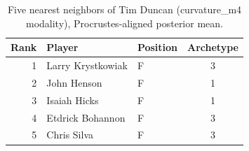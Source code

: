 \begin{table}[htbp]
  \centering\small
  \begin{tabular}{rllc}
    \toprule
    Rank & Player & Position & Archetype \\
    \midrule
    1 & Larry Krystkowiak & F & 3 \\
    2 & John Henson & F & 1 \\
    3 & Isaiah Hicks & F & 1 \\
    4 & Etdrick Bohannon & F & 3 \\
    5 & Chris Silva & F & 3 \\
    \bottomrule
  \end{tabular}
  \caption{Five nearest neighbors of Tim Duncan (curvature_m4 modality), Procrustes-aligned posterior mean.}
  \label{tab:Tim_Duncan_neighbors_curvature_m4}
\end{table}

